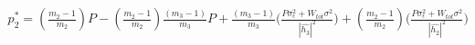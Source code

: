 \documentclass[preview]{standalone}
\begin{document}
\begin{align*}
p_2^\ast = \left(\frac{m_2 - 1}{m_2}\right) P - \left(\frac{m_2 - 1}{m_2}\right) \frac{\left(m_3 - 1\right)}{m_3} P + \frac{\left(m_3 - 1\right)}{m_3} \Bigg( \frac{P \sigma_\epsilon^2 + W_{tot} \sigma^2 }{ \left| \hat{h_3} \right| ^2 } \Bigg) + \left(\frac{m_2 - 1}{m_2}\right) \Bigg( \frac{P \sigma_\epsilon^2 + W_{tot} \sigma^2}{\left|\hat{h_2}\right|^2} \Bigg)
\end{align*}
\end{document}

